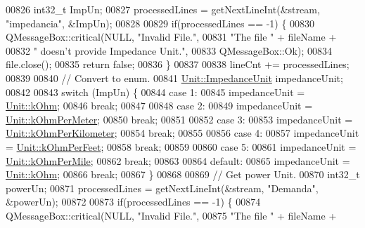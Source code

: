 \begin{DoxyCode}
00826   int32\_t ImpUn;
00827   processedLines = getNextLineInt(&stream, \textcolor{stringliteral}{"impedancia"}, &ImpUn);
00828 
00829   \textcolor{keywordflow}{if}(processedLines == -1) \{
00830     QMessageBox::critical(NULL, \textcolor{stringliteral}{"Invalid File."},
00831                           \textcolor{stringliteral}{"The file "} + fileName +
00832                           \textcolor{stringliteral}{" doesn't provide Impedance Unit."},
00833                           QMessageBox::Ok);
00834     file.close();
00835     \textcolor{keywordflow}{return} \textcolor{keyword}{false};
00836   \}
00837 
00838   lineCnt += processedLines;
00839 
00840   \textcolor{comment}{// Convert to enum.}
00841   \hyperlink{class_unit_a3747e779c805df24a71961290be3fbdf}{Unit::ImpedanceUnit} impedanceUnit;
00842 
00843   \textcolor{keywordflow}{switch} (ImpUn) \{
00844   \textcolor{keywordflow}{case} 1:
00845     impedanceUnit = \hyperlink{class_unit_a3747e779c805df24a71961290be3fbdfa6b9c74d1763eefbaf751eeecff0bd9da}{Unit::kOhm};
00846     \textcolor{keywordflow}{break};
00847 
00848   \textcolor{keywordflow}{case} 2:
00849     impedanceUnit = \hyperlink{class_unit_a3747e779c805df24a71961290be3fbdfa35e9ca44deb5a35fdb576111cf0db336}{Unit::kOhmPerMeter};
00850     \textcolor{keywordflow}{break};
00851 
00852   \textcolor{keywordflow}{case} 3:
00853     impedanceUnit = \hyperlink{class_unit_a3747e779c805df24a71961290be3fbdfa56a0289d2ddeff7ca4aa8ba410df79d6}{Unit::kOhmPerKilometer};
00854     \textcolor{keywordflow}{break};
00855 
00856   \textcolor{keywordflow}{case} 4:
00857     impedanceUnit = \hyperlink{class_unit_a3747e779c805df24a71961290be3fbdfa433b57934ca3be960ec7a60f3ea6ea87}{Unit::kOhmPerFeet};
00858     \textcolor{keywordflow}{break};
00859 
00860   \textcolor{keywordflow}{case} 5:
00861     impedanceUnit = \hyperlink{class_unit_a3747e779c805df24a71961290be3fbdfa1d5bb04c9ecda66b09891af21cd4f613}{Unit::kOhmPerMile};
00862     \textcolor{keywordflow}{break};
00863 
00864   \textcolor{keywordflow}{default}:
00865     impedanceUnit = \hyperlink{class_unit_a3747e779c805df24a71961290be3fbdfa6b9c74d1763eefbaf751eeecff0bd9da}{Unit::kOhm};
00866     \textcolor{keywordflow}{break};
00867   \}
00868 
00869   \textcolor{comment}{// Get power Unit.}
00870   int32\_t powerUn;
00871   processedLines = getNextLineInt(&stream, \textcolor{stringliteral}{"Demanda"}, &powerUn);
00872 
00873   \textcolor{keywordflow}{if}(processedLines == -1) \{
00874     QMessageBox::critical(NULL, \textcolor{stringliteral}{"Invalid File."},
00875                           \textcolor{stringliteral}{"The file "} + fileName +

\end{DoxyCode}

